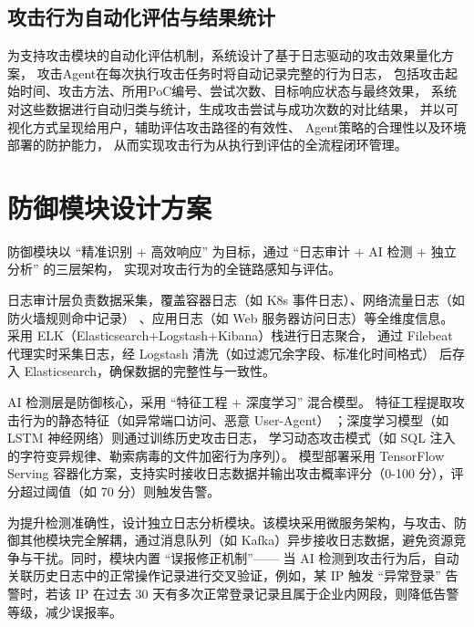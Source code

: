 \documentclass[lang=cn,10pt]{elegantbook}
\begin{document}
\subsection{攻击行为自动化评估与结果统计}

为支持攻击模块的自动化评估机制，系统设计了基于日志驱动的攻击效果量化方案，
攻击Agent在每次执行攻击任务时将自动记录完整的行为日志，
包括攻击起始时间、攻击方法、所用PoC编号、尝试次数、目标响应状态与最终效果，
系统对这些数据进行自动归类与统计，生成攻击尝试与成功次数的对比结果，
并以可视化方式呈现给用户，辅助评估攻击路径的有效性、
Agent策略的合理性以及环境部署的防护能力，
从而实现攻击行为从执行到评估的全流程闭环管理。


\section{防御模块设计方案}
防御模块以 “精准识别 + 高效响应” 为目标，通过 “日志审计 + AI 检测 + 独立分析” 的三层架构，
实现对攻击行为的全链路感知与评估。​

日志审计层负责数据采集，覆盖容器日志（如 K8s 事件日志）、网络流量日志（如防火墙规则命中记录）
、应用日志（如 Web 服务器访问日志）等全维度信息。
采用 ELK（Elasticsearch+Logstash+Kibana）栈进行日志聚合，
通过 Filebeat 代理实时采集日志，经 Logstash 清洗（如过滤冗余字段、标准化时间格式）
后存入 Elasticsearch，确保数据的完整性与一致性。​

AI 检测层是防御核心，采用 “特征工程 + 深度学习” 混合模型。
特征工程提取攻击行为的静态特征（如异常端口访问、恶意 User-Agent）
；深度学习模型（如 LSTM 神经网络）则通过训练历史攻击日志，
学习动态攻击模式（如 SQL 注入的字符变异规律、勒索病毒的文件加密行为序列）。
模型部署采用 TensorFlow Serving 容器化方案，支持实时接收日志数据并输出攻击概率评分（0-100 分），评分超过阈值（如 70 分）则触发告警。​


为提升检测准确性，设计独立日志分析模块。该模块采用微服务架构，与攻击、防御其他模块完全解耦，通过消息队列（如 Kafka）异步接收日志数据，避免资源竞争与干扰。同时，模块内置 “误报修正机制”—— 当 AI 检测到攻击行为后，自动关联历史日志中的正常操作记录进行交叉验证，例如，某 IP 触发 “异常登录” 告警时，若该 IP 在过去 30 天有多次正常登录记录且属于企业内网段，则降低告警等级，减少误报率。
\end{document}
